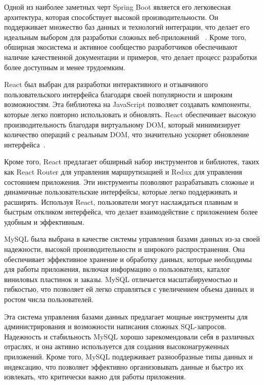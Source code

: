 \documentclass[14pt]{extarticle} %
\begin{document}
Одной из наиболее заметных черт Spring Boot является его легковесная архитектура, которая способствует высокой производительности. Он поддерживает множество баз данных и технологий интеграции, что делает его идеальным выбором для разработки сложных веб-приложений ~\cite{Spring.NET}. Кроме того, обширная экосистема и активное сообщество разработчиков обеспечивают наличие качественной документации и примеров, что делает процесс разработки более доступным и менее трудоемким.


React был выбран для разработки интерактивного и отзывчивого пользовательского интерфейса благодаря своей популярности и широким возможностям. Эта библиотека на JavaScript позволяет создавать компоненты, которые легко повторно использовать и обновлять. React обеспечивает высокую производительность благодаря виртуальному DOM, который минимизирует количество операций с реальным DOM, что значительно ускоряет обновление интерфейса~\cite{ReactDevBlog}.

Кроме того, React предлагает обширный набор инструментов и библиотек, таких как React Router для управления маршрутизацией и Redux для управления состоянием приложения. Эти инструменты позволяют разрабатывать сложные и динамичные пользовательские интерфейсы, которые легко поддерживать и расширять. Используя React, пользователи могут наслаждаться плавным и быстрым откликом интерфейса, что делает взаимодействие с приложением более удобным и эффективным.


MySQL была выбрана в качестве системы управления базами данных из-за своей надежности, высокой производительности и широкого распространения. Она обеспечивает эффективное хранение и обработку данных, которые необходимы для работы приложения, включая информацию о пользователях, каталог виниловых пластинок и заказы. MySQL отличается масштабируемостью и гибкостью, что позволяет ей легко справляться с увеличением объема данных и ростом числа пользователей.

Эта система управления базами данных предлагает мощные инструменты для администрирования и возможности написания сложных SQL-запросов. Надежность и стабильность MySQL хорошо зарекомендовали себя в различных отраслях, и она активно используется для создания высоконагруженных приложений. Кроме того, MySQL поддерживает разнообразные типы данных и индексацию, что позволяет эффективно организовывать данные и быстро их извлекать, что критически важно для работы приложения.
\end{document}
